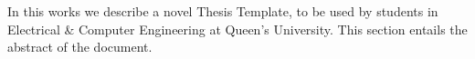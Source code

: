 
In this works we describe a novel Thesis Template, to be used by students in Electrical \& Computer Engineering at Queen's University. This section entails the abstract of the document. 